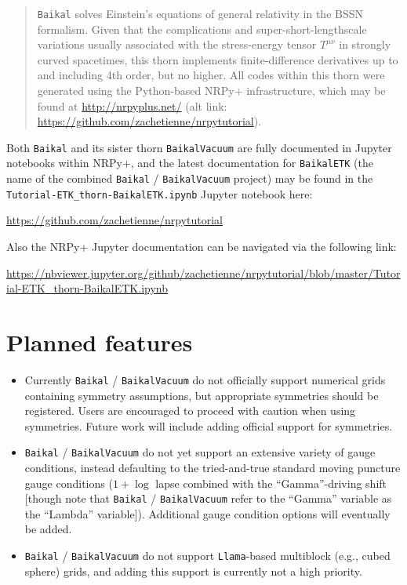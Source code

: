 \begin{abstract}
\texttt{Baikal} solves Einstein's equations of general
relativity in the BSSN formalism. Given that the complications and
super-short-lengthscale variations usually associated with the
stress-energy tensor $T^{\mu\nu}$ in strongly curved spacetimes, this
thorn implements finite-difference derivatives up to and including 4th
order, but no higher. All codes
within this thorn were generated using the Python-based NRPy+
infrastructure, which may be found at \url{http://nrpyplus.net/} (alt
link: \url{https://github.com/zachetienne/nrpytutorial}).
\end{abstract}

Both \texttt{Baikal} and its sister thorn \texttt{BaikalVacuum} are
fully documented in Jupyter notebooks within NRPy+, and
the latest documentation for \texttt{BaikalETK} (the name of the
combined \texttt{Baikal} / \texttt{BaikalVacuum} project) may be found
in the \texttt{Tutorial-ETK\_thorn-BaikalETK.ipynb} Jupyter notebook here:

\url{https://github.com/zachetienne/nrpytutorial}

Also the NRPy+ Jupyter documentation can be navigated via the
following link:

\url{https://nbviewer.jupyter.org/github/zachetienne/nrpytutorial/blob/master/Tutorial-ETK_thorn-BaikalETK.ipynb}

\section{Planned features}

\begin{itemize}
\item Currently \texttt{Baikal} / \texttt{BaikalVacuum} do not officially
support numerical grids containing symmetry assumptions, but
appropriate symmetries should be registered. Users are encouraged to
proceed with caution when using symmetries. Future work will include adding
official support for symmetries.
\item \texttt{Baikal} / \texttt{BaikalVacuum} do not yet support an
  extensive variety of gauge conditions, instead defaulting to the
  tried-and-true standard moving puncture gauge conditions ($1+\log$
  lapse combined with the ``Gamma''-driving shift [though note that
    \texttt{Baikal} / \texttt{BaikalVacuum} refer to the  ``Gamma''
    variable as the ``Lambda'' variable]). Additional gauge condition
  options will eventually be added.
\item \texttt{Baikal} / \texttt{BaikalVacuum} do not support
  \texttt{Llama}-based multiblock (e.g., cubed sphere) grids, and
  adding this support is currently not a high priority.
\end{itemize}





